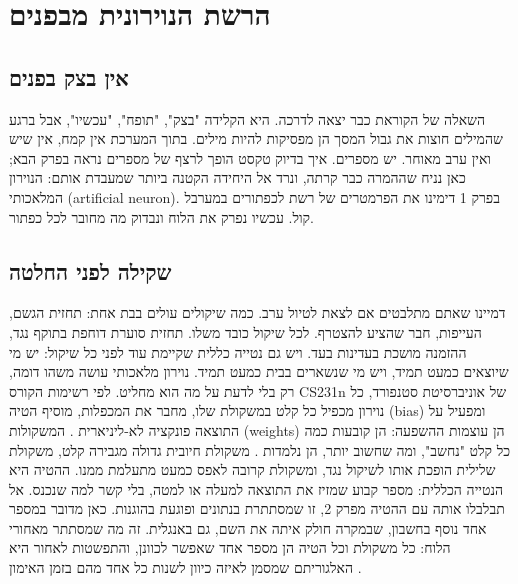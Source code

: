 \chapter{הרשת הנוירונית מבפנים}\label{ch:03}
\section{אין בצק בפנים}
השאלה של הקוראת כבר יצאה לדרכה. היא הקלידה "בצק", "תופח", "עכשיו", אבל ברגע שהמילים חוצות את גבול המסך הן מפסיקות להיות מילים. בתוך המערכת אין קמח, אין שיש ואין ערב מאוחר. יש מספרים. איך בדיוק טקסט הופך לרצף של מספרים נראה בפרק הבא; כאן נניח שההמרה כבר קרתה, ונרד אל היחידה הקטנה ביותר שמעבדת אותם: הנוירון המלאכותי (artificial neuron).
בפרק 1 דימינו את הפרמטרים של רשת לכפתורים במערבל קול. עכשיו נפרק את הלוח ונבדוק מה מחובר לכל כפתור.
\section{שקילה לפני החלטה}
דמיינו שאתם מתלבטים אם לצאת לטיול ערב. כמה שיקולים עולים בבת אחת: תחזית הגשם, העייפות, חבר שהציע להצטרף. לכל שיקול כובד משלו. תחזית סוערת דוחפת בתוקף נגד, ההזמנה מושכת בעדינות בעד. ויש גם נטייה כללית שקיימת עוד לפני כל שיקול: יש מי שיוצאים כמעט תמיד, ויש מי שנשארים בבית כמעט תמיד.
נוירון מלאכותי עושה משהו דומה, רק בלי לדעת על מה הוא מחליט. לפי רשימות הקורס CS231n של אוניברסיטת סטנפורד, כל נוירון מכפיל כל קלט במשקולת שלו, מחבר את המכפלות, מוסיף הטיה (bias) ומפעיל על התוצאה פונקציה לא-ליניארית \cite{S-ch03-01}. המשקולות (weights) הן עוצמות ההשפעה: הן קובעות כמה כל קלט "נחשב", ומה שחשוב יותר, הן נלמדות \cite{S-ch03-01}. משקולת חיובית גדולה מגבירה קלט, משקולת שלילית הופכת אותו לשיקול נגד, ומשקולת קרובה לאפס כמעט מתעלמת ממנו. ההטיה היא הנטייה הכללית: מספר קבוע שמזיז את התוצאה למעלה או למטה, בלי קשר למה שנכנס. אל תבלבלו אותה עם ההטיה מפרק 2, זו שמסתתרת בנתונים ופוגעת בהוגנות. כאן מדובר במספר אחד נוסף בחשבון, שבמקרה חולק איתה את השם, גם באנגלית.
זה מה שמסתתר מאחורי הלוח: כל משקולת וכל הטיה הן מספר אחד שאפשר לכוונן, והתפשטות לאחור היא האלגוריתם שמסמן לאיזה כיוון לשנות כל אחד מהם בזמן האימון \cite{S-ch01-05}.
